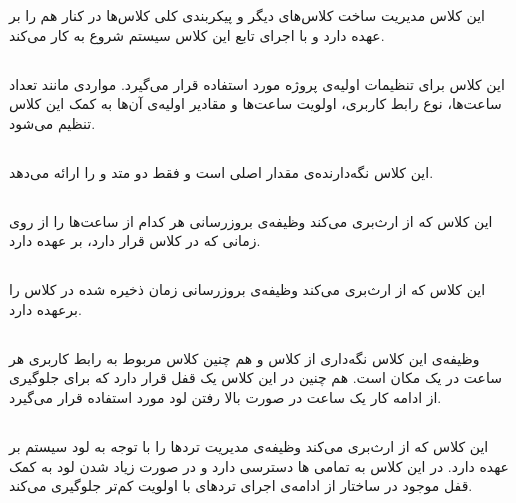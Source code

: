 \documentclass[oneside,a4paper,11pt]{report}
\begin{document}
	این کلاس مدیریت ساخت کلاس‌های دیگر و پیکربندی کلی کلاس‌ها در کنار هم را بر عهده دارد و
	با اجرای تابع 
	این کلاس سیستم شروع به کار می‌کند.
	
	\subsection{}
	
	این کلاس برای تنظیمات اولیه‌ی پروژه مورد استفاده قرار می‌گیرد. مواردی مانند تعداد ساعت‌ها، نوع رابط کاربری، اولویت ساعت‌ها و مقادیر اولیه‌ی آن‌ها به کمک این کلاس تنظیم می‌شود.
	
	
	\subsection{}
	
	این کلاس نگه‌دارنده‌ی مقدار اصلی  است و فقط دو متد 
	و 
	را ارائه می‌دهد.
	
	\subsection{}
	
	
	این کلاس که از 
	ارث‌بری می‌کند وظیفه‌ی بروزرسانی هر کدام از ساعت‌ها را از روی زمانی که در کلاس 
	قرار دارد، بر عهده دارد.
	
	\subsection{}
	
	
	این کلاس که از 
	ارث‌بری می‌کند وظیفه‌ی بروزرسانی زمان ذخیره شده در کلاس 
	را برعهده دارد.
	
	\subsection{}
	وظیفه‌ی این کلاس نگه‌داری از کلاس 
	و هم چنین کلاس مربوط به رابط کاربری هر ساعت در یک مکان است. هم چنین در این کلاس یک قفل قرار دارد که برای جلوگیری از ادامه کار یک ساعت در صورت بالا رفتن لود 
	مورد استفاده قرار می‌گیرد.
	
	\subsection{}
	
	این کلاس که از 
	ارث‌بری می‌کند
	وظیفه‌‌ی مدیریت تردها را با توجه به لود سیستم بر عهده دارد. در این کلاس به تمامی
	ها دسترسی دارد و در صورت زیاد شدن لود
	به کمک قفل موجود در ساختار
	از ادامه‌ی اجرای تردهای با اولویت کم‌تر جلوگیری می‌کند.
	
\end{document}
